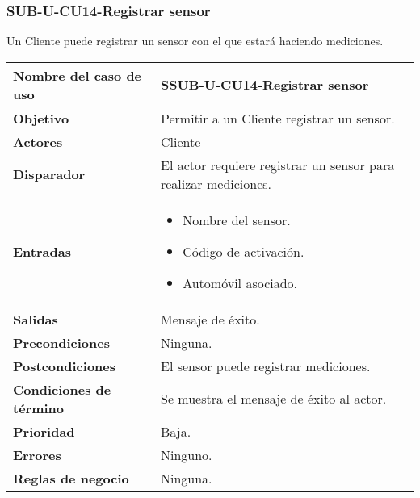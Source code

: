 \subsubsection{SUB-U-CU14-Registrar sensor}\label{SUB-U-CU14}
Un Cliente puede registrar un sensor con el que estará haciendo mediciones.

\begin{longtable}{|J{5cm}|J{10.3cm}|}
	\hline
	\textbf{Nombre del caso de uso} &
		SSUB-U-CU14-Registrar sensor \\ \hline
	\textbf{Objetivo} &
		Permitir a un Cliente registrar un sensor. \\ \hline
	\textbf{Actores} &
		Cliente \\ \hline 
	\textbf{Disparador} & 
		El actor requiere registrar un sensor para realizar mediciones. \\ \hline 
	\textbf{Entradas} & 
		\begin{itemize}
				\item Nombre del sensor.
				\item Código de activación.
				\item Automóvil asociado.
		\end{itemize}\\ \hline 
	\textbf{Salidas} & Mensaje de éxito.
		\\ \hline
	\textbf{Precondiciones} & Ninguna.
		\\ \hline
	\textbf{Postcondiciones} & El sensor puede registrar mediciones.
		\\ \hline
	\textbf{Condiciones de término} & Se muestra el mensaje de éxito al actor.
		\\ \hline 
	\textbf{Prioridad} & 
		Baja. \\ \hline
	\textbf{Errores} & Ninguno.
		\\ \hline
	\textbf{Reglas de negocio} & Ninguna.
		 \\ \hline
\end{longtable}

